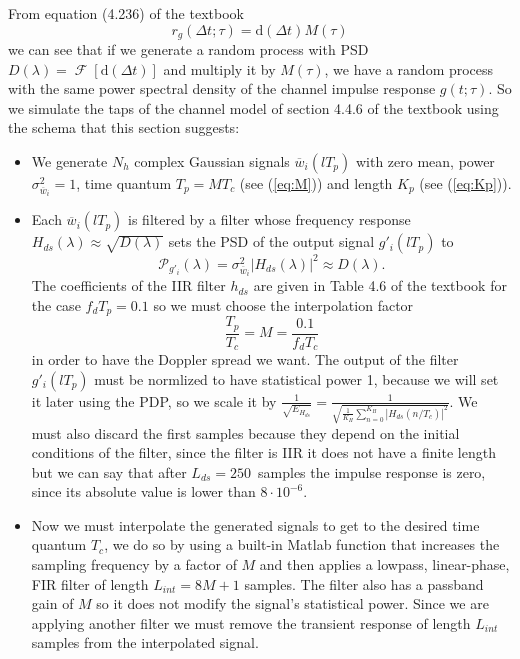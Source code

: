 \documentclass[a4paper,twoside]{article}
\newcommand{\abs}[1]{\left|#1\right|}
\newcommand{\F}[1]{\operatorname{\mathcal{F}}\left[#1\right]}
\begin{document}
From equation (4.236) of the textbook
\[ r_g(\Delta t;\tau) = \mathrm{d}(\Delta t)M(\tau) \]
we can see that if we generate a random process with PSD $D(\lambda) =
\F{\mathrm{d}(\Delta t)}$ and multiply it by $M(\tau)$, we have a
random process with the same power spectral density of the channel
impulse response $g(t;\tau)$. So we simulate the taps of the channel
model of section 4.4.6 of the textbook using the schema that this
section suggests:
\begin{itemize}
  \item We generate $N_h$ complex Gaussian signals
    $\overline{w}_i(lT_p)$ with zero mean, power
    $\sigma^2_{\overline{w}_i} = 1$, time quantum $T_p = MT_c$ (see
    (\ref{eq:M})) and length $K_p$ (see (\ref{eq:Kp})).
  \item Each $\overline{w}_i(lT_p)$ is filtered by a filter whose
    frequency response $ H_{ds}(\lambda) \approx \sqrt{D(\lambda)} $
    sets the PSD of the output signal $g'_i(lT_p)$ to
    \[ \mathcal{P}_{g'_i}(\lambda) = \sigma^2_{\overline{w}_i} \abs{H_{ds}(\lambda)}^2 \approx D(\lambda) . \]
    The coefficients of the IIR filter $h_{ds}$ are given in Table 4.6
    of the textbook for the case $f_dT_p = 0.1$ so we must choose the
    interpolation factor
    \begin{equation}
      \frac{T_p}{T_c} = M = \frac{0.1}{f_dT_c}
      \label{eq:M}
    \end{equation}
    in order to have the Doppler spread we want. The output of the
    filter $g'_i(lT_p)$ must be normlized to have statistical power 1,
    because we will set it later using the PDP, so we scale it by $
    \frac{1}{\sqrt{E_{H_{ds}}}} =
    \frac{1}{\sqrt{\frac{1}{K_H}\sum_{n=0}^{K_H}
        \abs{H_{ds}(n/T_c)}^2}} $. We must also discard the first
    samples because they depend on the initial conditions of the
    filter, since the filter is IIR it does not have a finite length
    but we can say that after $L_{ds} = 250$~samples the impulse
    response is zero, since its absolute value is lower than
    $8\cdot10^{-6}$.
    \item Now we must interpolate the generated signals to get to the
      desired time quantum $T_c$, we do so by using a built-in Matlab
      function that increases the sampling frequency by a factor of
      $M$ and then applies a lowpass, linear-phase, FIR filter of
      length $L_{int} = 8M+1$ samples. The filter also has a passband
      gain of $M$ so it does not modify the signal's statistical
      power. Since we are applying another filter we must remove the
      transient response of length $L_{int}$ samples from the
      interpolated signal.


\end{itemize}
\end{document}
